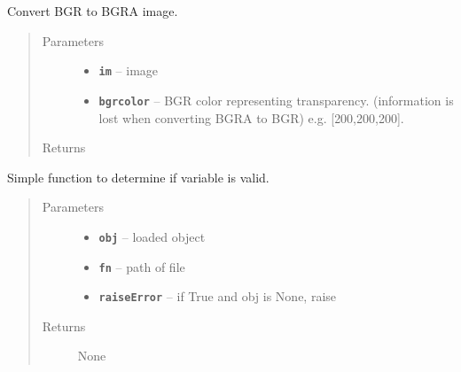\documentclass[letterpaper,10pt,english]{sphinxmanual}
\begin{document}
\begin{fulllineitems}
\label{RRtoolbox.lib:RRtoolbox.lib.image.bgra2bgr}
Convert BGR to BGRA image.
\begin{quote}\begin{description}
\item[{Parameters}] \leavevmode\begin{itemize}
\item {} 
\textbf{\texttt{im}} -- image

\item {} 
\textbf{\texttt{bgrcolor}} -- BGR color representing transparency. (information is lost when
converting BGRA to BGR) e.g. {[}200,200,200{]}.

\end{itemize}

\item[{Returns}] \leavevmode


\end{description}\end{quote}

\end{fulllineitems}


\begin{fulllineitems}
\label{RRtoolbox.lib:RRtoolbox.lib.image.checkLoaded}
Simple function to determine if variable is valid.
\begin{quote}\begin{description}
\item[{Parameters}] \leavevmode\begin{itemize}
\item {} 
\textbf{\texttt{obj}} -- loaded object

\item {} 
\textbf{\texttt{fn}} -- path of file

\item {} 
\textbf{\texttt{raiseError}} -- if True and obj is None, raise

\end{itemize}

\item[{Returns}] \leavevmode
None

\end{description}\end{quote}

\end{fulllineitems}
\end{document}
